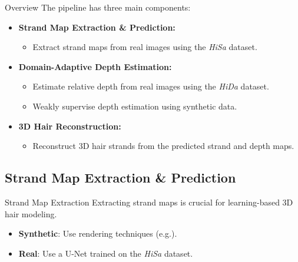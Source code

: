 \begin{frame}[t]{Overview}
    The pipeline has three main components:
    \begin{itemize}
        \item \textbf{Strand Map Extraction \& Prediction:} 
        \begin{itemize}
            \item Extract strand maps from real images using the \textit{HiSa} dataset.
        \end{itemize}
        \item \textbf{Domain-Adaptive Depth Estimation:}
        \begin{itemize}
            \item Estimate relative depth from real images using the \textit{HiDa} dataset.
            \item Weakly supervise depth estimation using synthetic data.
        \end{itemize}
        \item \textbf{3D Hair Reconstruction:}
        \begin{itemize}
            \item Reconstruct 3D hair strands from the predicted strand and depth maps.
        \end{itemize}
    \end{itemize}
\end{frame}

\subsection{Strand Map Extraction \& Prediction}

\begin{frame}[t]{Strand Map Extraction}
    Extracting strand maps is crucial for learning-based 3D hair modeling.
    \begin{itemize}
        \item \textbf{Synthetic}: Use rendering techniques (e.g.\cite{liu2019softras}).
        \item \textbf{Real}: Use a U-Net trained on the \textit{HiSa} dataset.
    \end{itemize}
\end{frame}

